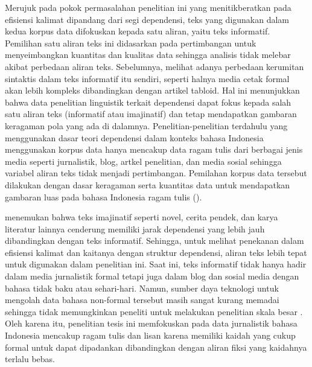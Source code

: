 Merujuk pada pokok permasalahan penelitian ini yang menitikberatkan pada efisiensi kalimat dipandang dari segi dependensi, teks yang digunakan dalam kedua korpus data difokuskan kepada satu aliran, yaitu teks informatif. Pemilihan satu aliran teks ini didasarkan pada pertimbangan untuk menyeimbangkan kuantitas dan kualitas data sehingga analisis tidak melebar akibat perbedaan aliran teks. Sebelumnya, \cite{miller2011critical} melihat adanya perbedaan kerumitan sintaktis dalam teks informatif itu sendiri, seperti halnya media cetak formal akan lebih kompleks dibandingkan dengan artikel tabloid. Hal ini menunjukkan bahwa data penelitian linguistik terkait dependensi dapat fokus kepada salah satu aliran teks (informatif atau imajinatif) dan tetap mendapatkan gambaran keragaman pola yang ada di dalamnya. Penelitian-penelitian terdahulu yang menggunakan dasar teori dependensi dalam konteks bahasa Indonesia menggunakan korpus data hanya mencakup data ragam tulis dari berbagai jenis media seperti jurnalistik, blog, artkel penelitian, dan media sosial sehingga variabel aliran teks tidak menjadi pertimbangan. Pemilahan korpus data tersebut dilakukan dengan dasar keragaman serta kuantitas data untuk mendapatkan gambaran luas pada bahasa Indonesia ragam tulis (\citealp{kamayani2011dependency, green2012indonesian, irmawati2015dependency, futrell2015large}). 

\cite{wang2017effects} menemukan bahwa teks imajinatif seperti novel, cerita pendek, dan karya literatur lainnya cenderung memiliki jarak dependensi yang lebih jauh dibandingkan dengan teks informatif. Sehingga, untuk melihat penekanan dalam efisiensi kalimat dan kaitanya dengan struktur dependensi, aliran teks lebih tepat untuk digunakan dalam penelitian ini. Saat ini, teks informatif tidak hanya hadir dalam media jurnalistik formal tetapi juga dalam blog dan sosial media dengan bahasa tidak baku atau sehari-hari. Namun, sumber daya teknologi untuk mengolah data bahasa non-formal tersebut masih sangat kurang memadai sehingga tidak memungkinkan peneliti untuk melakukan penelitian skala besar \citep{green2012indonesian}. Oleh karena itu, penelitian tesis ini memfokuskan pada data jurnalistik bahasa Indonesia mencakup ragam tulis dan lisan karena memiliki kaidah yang cukup formal untuk dapat dipadankan dibandingkan dengan aliran fiksi yang kaidahnya terlalu bebas. 

